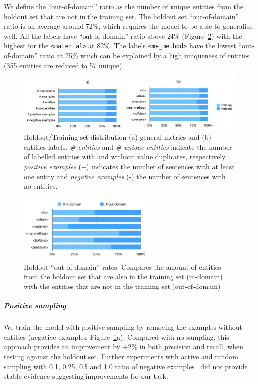 \documentclass{article}
\begin{document}
We define the ``out-of-domain'' ratio as the number of unique entities from the holdout set that are not in the training set. 
The holdout set ``out-of-domain'' ratio is on average around 72\%, which requires the model to be able to generalise well. 
All the labels have ``out-of-domain'' ratio above 24\%  (Figure~\ref{fig:out-domain-holdout}) with the highest for the \texttt{<material>} at 82\%. The labels \texttt{<me\_method>} have the lowest ``out-of-domain'' ratio at 25\% which can be explained by a high uniqueness of entities (355 entities are reduced to 57 unique). 

\begin{figure}[ht]
\centering
\includegraphics[width=\textwidth]{holdout-training-set}
\caption{Holdout/Training set distribution (a) general metrics and (b) entities labels.
\textit{\# entities} and \textit{\# unique entities} indicate the number of labelled entities with and without value duplicates, respectively. \textit{positive examples} (+) indicates the number of sentences with at least one entity and \textit{negative examples} (-) the number of sentences with no entities.}
\label{fig:training-holdout-set-distribution}
\end{figure}

\begin{figure}[ht]
\centering
\includegraphics[width=0.6\textwidth]{out-domain-holdout-unique}
\caption{Holdout ``out-of-domain'' rates. Compares the amount of entities from the holdout set that are also in the training set (in-domain) with the entities that are not in the training set (out-of-domain)}
\label{fig:out-domain-holdout}
\end{figure}

\subparagraph{Positive sampling} 
We train the model with positive sampling by removing the examples without entities (negative examples, Figure~\ref{fig:training-holdout-set-distribution}a). 
Compared with no sampling, this approach provides an improvement by +2\% in both precision and recall, when testing against the holdout set. 
Further experiments with active and random sampling with 0.1, 0.25, 0.5 and 1.0 ratio of negative examples~\cite{lopez2021mining} did not provide stable evidence suggesting improvements for our task. 
\end{document}

